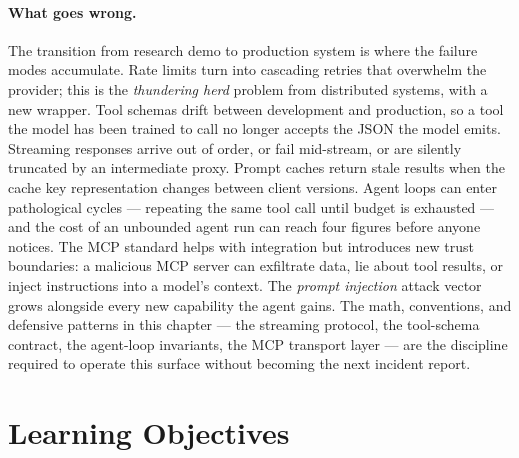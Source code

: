 \paragraph{What goes wrong.}
The transition from research demo to production system is where the
failure modes accumulate. Rate limits turn into cascading retries
that overwhelm the provider; this is the \emph{thundering herd}
problem from distributed systems, with a new wrapper. Tool
schemas drift between development and production, so a tool the
model has been trained to call no longer accepts the JSON the model
emits. Streaming responses arrive out of order, or fail
mid-stream, or are silently truncated by an intermediate proxy.
Prompt caches return stale results when the cache key
representation changes between client versions. Agent loops can
enter pathological cycles --- repeating the same tool call until
budget is exhausted --- and the cost of an unbounded agent run can
reach four figures before anyone notices. The MCP standard helps
with integration but introduces new trust boundaries: a malicious
MCP server can exfiltrate data, lie about tool results, or inject
instructions into a model's context. The \emph{prompt injection}
attack vector grows alongside every new capability the agent gains.
The math, conventions, and defensive patterns in this chapter ---
the streaming protocol, the tool-schema contract, the agent-loop
invariants, the MCP transport layer --- are the discipline required
to operate this surface without becoming the next incident
report.

\section{Learning Objectives}

